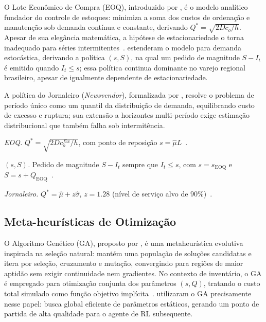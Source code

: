 \documentclass[a4paper,11pt]{article}
\begin{document}
O Lote Econômico de Compra (EOQ), introduzido por \citet{harris:1913},
é o modelo analítico fundador do controle de estoques: minimiza a
soma dos custos de ordenação e manutenção sob demanda contínua e
constante, derivando $Q^* = \sqrt{2Dc_o/h}$. Apesar de sua
elegância matemática, a hipótese de estacionariedade o torna
inadequado para séries intermitentes~\citep{silver:2017}.
\citet{hadley:1963} estenderam o modelo para demanda estocástica,
derivando a política $(s,S)$, na qual um pedido de magnitude $S-I_t$
é emitido quando $I_t \leq s$; essa política continua dominante no
varejo regional brasileiro, apesar de igualmente dependente de
estacionariedade. 

A política do Jornaleiro (\textit{Newsvendor}),
formalizada por \citet{cachon:2009}, resolve o problema de período
único como um quantil da distribuição de demanda, equilibrando custo
de excesso e ruptura; sua extensão a horizontes multi-período exige
estimação distribucional que também falha sob intermitência.

\emph{EOQ.} $Q^* = \sqrt{2 D c_o^{fix} / h}$, com ponto de
reposição $s = \hat{\mu} L$~\citep{harris:1913}.

\emph{$(s,S)$.} Pedido de magnitude $S - I_t$ sempre que
$I_t \leq s$, com $s = s_\text{EOQ}$ e
$S = s + Q_\text{EOQ}$~\citep{hadley:1963}.

\emph{Jornaleiro.} $Q^* = \hat{\mu} + z\hat{\sigma}$,
$z = 1.28$ (nível de serviço alvo de $90\%$)~\citep{cachon:2009}.

\subsection{Meta-heurísticas de Otimização}


O Algoritmo Genético (GA), proposto por \citet{holland:1975}, é uma
metaheurística evolutiva inspirada na seleção natural: mantém uma
população de soluções candidatas e itera por seleção, cruzamento e
mutação, convergindo para regiões de maior aptidão sem exigir
continuidade nem gradientes. No contexto de inventário, o GA é
empregado para otimização conjunta dos parâmetros $(s, Q)$, tratando
o custo total simulado como função objetivo implícita~\citep{anna:2006}.
\citet{zabraoui:2025} utilizaram o GA precisamente nesse papel:
busca global eficiente de parâmetros estáticos, gerando um ponto de
partida de alta qualidade para o agente de RL subsequente.
\end{document}
